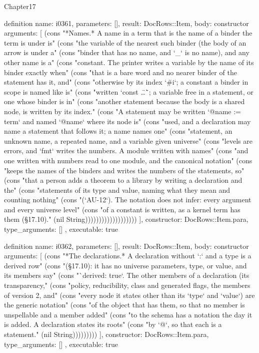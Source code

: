\begin{lexlean}{Chapter17}
\begin{semanticmodule}
definition{
  name: i0361,
  parameters: [],
  result: DocRows::Item,
  body: constructor{
    arguments: [
      (cons "*Names.* A name in a term that is the name of a binder the term is under is" (cons "the variable of the nearest such binder (the body of an arrow is under a" (cons "binder that has no name, and `_` is no name), and any other name is a" (cons "constant. The printer writes a variable by the name of its binder exactly when" (cons "that is a bare word and no nearer binder of the statement has it, and" (cons "otherwise by its index `#i`; a constant a binder in scope is named like is" (cons "written `const \"…\"`; a variable free in a statement, or one whose binder is in" (cons "another statement because the body is a shared node, is written by its index." (cons "A statement may be written `@name := term` and named `@name` where its node is" (cons "used, and a declaration may name a statement that follows it; a name names one" (cons "statement, an unknown name, a repeated name, and a variable given universe" (cons "levels are errors, and `fmt` writes the numbers. A module written with names" (cons "and one written with numbers read to one module, and the canonical notation" (cons "keeps the names of the binders and writes the numbers of the statements, so" (cons "that a person adds a theorem to a library by writing a declaration and the" (cons "statements of its type and value, naming what they mean and counting nothing" (cons "(`AU-12`). The notation does not infer: every argument and every universe level" (cons "of a constant is written, as a kernel term has them (§17.10)." (nil String)))))))))))))))))))
    ],
    constructor: DocRows::Item.para,
    type_arguments: []
  },
  executable: true
}

definition{
  name: i0362,
  parameters: [],
  result: DocRows::Item,
  body: constructor{
    arguments: [
      (cons "*The declarations.* A declaration without `:` and a type is a derived row" (cons "(§17.10): it has no universe parameters, type, or value, and its members say" (cons "`derived: true`. The other members of a declaration (its transparency," (cons "policy, reducibility, class and generated flags, the members of version 2, and" (cons "every node it states other than its `type` and `value`) are the generic notation" (cons "of the object that has them, so that no member is unspellable and a member added" (cons "to the schema has a notation the day it is added. A declaration states its roots" (cons "by `@`, so that each is a statement." (nil String)))))))))
    ],
    constructor: DocRows::Item.para,
    type_arguments: []
  },
  executable: true
}


\end{semanticmodule}
\end{lexlean}
